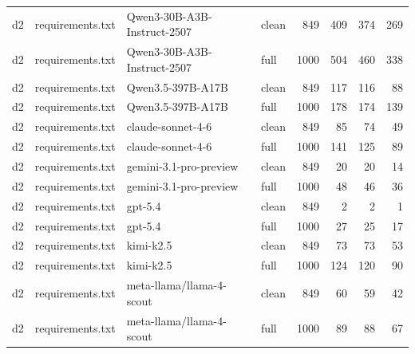 \begin{tabular}{llllrrrr}
d2 & requirements.txt & Qwen3-30B-A3B-Instruct-2507 & clean & 849 & 409 & 374 & 269 \\
d2 & requirements.txt & Qwen3-30B-A3B-Instruct-2507 & full & 1000 & 504 & 460 & 338 \\
d2 & requirements.txt & Qwen3.5-397B-A17B & clean & 849 & 117 & 116 & 88 \\
d2 & requirements.txt & Qwen3.5-397B-A17B & full & 1000 & 178 & 174 & 139 \\
d2 & requirements.txt & claude-sonnet-4-6 & clean & 849 & 85 & 74 & 49 \\
d2 & requirements.txt & claude-sonnet-4-6 & full & 1000 & 141 & 125 & 89 \\
d2 & requirements.txt & gemini-3.1-pro-preview & clean & 849 & 20 & 20 & 14 \\
d2 & requirements.txt & gemini-3.1-pro-preview & full & 1000 & 48 & 46 & 36 \\
d2 & requirements.txt & gpt-5.4 & clean & 849 & 2 & 2 & 1 \\
d2 & requirements.txt & gpt-5.4 & full & 1000 & 27 & 25 & 17 \\
d2 & requirements.txt & kimi-k2.5 & clean & 849 & 73 & 73 & 53 \\
d2 & requirements.txt & kimi-k2.5 & full & 1000 & 124 & 120 & 90 \\
d2 & requirements.txt & meta-llama/llama-4-scout & clean & 849 & 60 & 59 & 42 \\
d2 & requirements.txt & meta-llama/llama-4-scout & full & 1000 & 89 & 88 & 67 \\
\bottomrule
\end{tabular}

